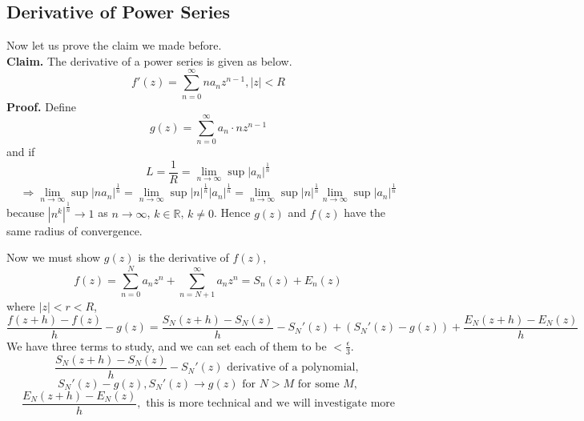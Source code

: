\documentclass[11pt]{article}
\begin{document}
\subsection{Derivative of Power Series}
Now let us prove the claim we made before.\\ 
\textbf{Claim.} The derivative of a power series is given as below. 
$$f'(z) = \sum_{n = 0}^{\infty}na_nz^{n - 1}, |z| < R$$ 
\textbf{Proof.} Define 
$$g(z) = \sum_{n = 0}^{\infty} a_n\cdot nz^{n - 1}$$ 
and if 
$$ L = \frac{1}{R} = \lim_{n \to \infty}\sup |a_n|^{\frac{1}{n}} $$
$$ \Rightarrow \lim_{n \to \infty} \sup |na_n|^{\frac{1}{n}} = \lim_{n \to \infty}\sup |n|^{\frac{1}{n}}|a_n|^{\frac{1}{n}} = \lim_{n \to \infty}\sup|n|^{\frac{1}{n}}\lim_{n \to \infty} \sup |a_n|^{\frac{1}{n}}$$
because $|n^k|^{\frac{1}{n}} \to 1$ as $n \to \infty$, $k \in \mathbb{R}$, $k \neq 0$. Hence $g(z)$ and $f(z)$ have the same radius of convergence. 

Now we must show $g(z)$ is the derivative of $f(z)$, 
$$f(z) = \sum_{n = 0}^N a_nz^n + \sum_{n = N + 1}^{\infty} a_nz^n = S_n(z) + E_n(z)$$ 
where $|z| < r < R$, 
$$ \frac{f(z+h) -f(z)}{h} - g(z) = \frac{S_N(z + h) - S_N(z)}{h} - S_N'(z) + (S_N'(z) - g(z)) + \frac{E_N(z + h) - E_N(z)}{h}$$
We have three terms to study, and we can set each of them to be $< \frac{\epsilon}{3}$.
\begin{equation*}
\frac{S_N(z + h) - S_N(z)}{h} - S_N'(z) \mbox{ derivative of a polynomial, } 
\end{equation*}
\begin{equation*}
S_N'(z) - g(z), S_N'(z) \to g(z) \mbox{ for } N > M \mbox{ for some } M,
\end{equation*}
\begin{equation*}
\frac{E_N(z + h) - E_N(z)}{h}, \mbox{ this is more technical and we will investigate more}
\end{equation*}
\end{document}
